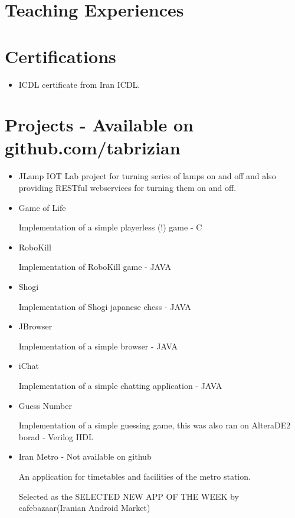 \documentclass[11pt,a4paper,sans]{moderncv}
\begin{document}
\section{ Teaching Experiences}

\section{ Certifications}
\begin{itemize}
    \item ICDL certificate from Iran ICDL.
\end{itemize}
\section{ Projects - Available on github.com/tabrizian}
\begin{itemize}
    \item JLamp
        IOT Lab project for turning series of lamps on and off and also providing
        RESTful webservices for turning them on and off.
    \item Game of Life

        Implementation of a simple playerless (!) game - C
    \item RoboKill

        Implementation of RoboKill game - JAVA
    \item Shogi

        Implementation of Shogi japanese chess - JAVA
    \item JBrowser

        Implementation of a simple browser - JAVA
    \item iChat

        Implementation of a simple chatting application - JAVA
    \item Guess Number

        Implementation of a simple guessing game, this was also ran on AlteraDE2 borad - Verilog HDL
    \item Iran Metro - Not available on github

        An application for timetables and facilities of the metro station.

        Selected as the SELECTED NEW APP OF THE WEEK by cafebazaar(Iranian Android Market)
\end{itemize}
\end{document}
